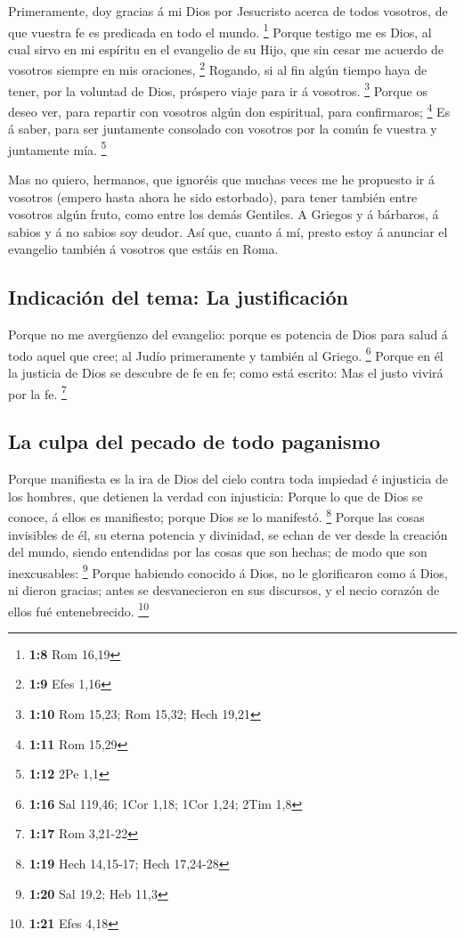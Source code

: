  Primeramente, doy gracias á mi Dios por Jesucristo acerca
de todos vosotros, de que vuestra fe es predicada en todo el mundo.
\footnote{\textbf{1:8} Rom 16,19}  Porque testigo me es
Dios, al cual sirvo en mi espíritu en el evangelio de su Hijo, que sin
cesar me acuerdo de vosotros siempre en mis oraciones, \footnote{\textbf{1:9}
  Efes 1,16}  Rogando, si al fin algún tiempo haya de
tener, por la voluntad de Dios, próspero viaje para ir á vosotros.
\footnote{\textbf{1:10} Rom 15,23; Rom 15,32; Hech 19,21}
 Porque os deseo ver, para repartir con vosotros algún
don espiritual, para confirmaros; \footnote{\textbf{1:11} Rom 15,29}
 Es á saber, para ser juntamente consolado con vosotros
por la común fe vuestra y juntamente mía. \footnote{\textbf{1:12} 2Pe
  1,1}

 Mas no quiero, hermanos, que ignoréis que muchas veces
me he propuesto ir á vosotros (empero hasta ahora he sido estorbado),
para tener también entre vosotros algún fruto, como entre los demás
Gentiles.  A Griegos y á bárbaros, á sabios y á no sabios
soy deudor.  Así que, cuanto á mí, presto estoy á
anunciar el evangelio también á vosotros que estáis en Roma.

\hypertarget{indicaciuxf3n-del-tema-la-justificaciuxf3n}{%
\subsection{Indicación del tema: La
justificación}\label{indicaciuxf3n-del-tema-la-justificaciuxf3n}}

 Porque no me avergüenzo del evangelio: porque es
potencia de Dios para salud á todo aquel que cree; al Judío primeramente
y también al Griego. \footnote{\textbf{1:16} Sal 119,46; 1Cor 1,18; 1Cor
  1,24; 2Tim 1,8}  Porque en él la justicia de Dios se
descubre de fe en fe; como está escrito: Mas el justo vivirá por la fe.
\footnote{\textbf{1:17} Rom 3,21-22}

\hypertarget{la-culpa-del-pecado-de-todo-paganismo}{%
\subsection{La culpa del pecado de todo
paganismo}\label{la-culpa-del-pecado-de-todo-paganismo}}

 Porque manifiesta es la ira de Dios del cielo contra
toda impiedad é injusticia de los hombres, que detienen la verdad con
injusticia:  Porque lo que de Dios se conoce, á ellos es
manifiesto; porque Dios se lo manifestó. \footnote{\textbf{1:19} Hech
  14,15-17; Hech 17,24-28}  Porque las cosas invisibles
de él, su eterna potencia y divinidad, se echan de ver desde la creación
del mundo, siendo entendidas por las cosas que son hechas; de modo que
son inexcusables: \footnote{\textbf{1:20} Sal 19,2; Heb 11,3}
 Porque habiendo conocido á Dios, no le glorificaron como
á Dios, ni dieron gracias; antes se desvanecieron en sus discursos, y el
necio corazón de ellos fué entenebrecido. \footnote{\textbf{1:21} Efes
  4,18}

